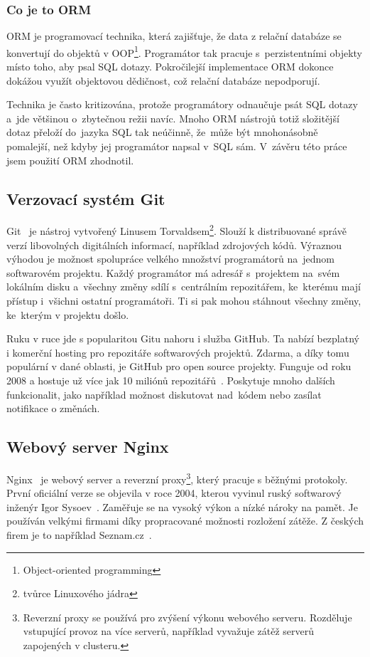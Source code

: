 \subsubsection*{Co je to ORM}

ORM je programovací technika, která zajišťuje, že data z relační databáze
se konvertují do objektů v OOP\footnote{Object-oriented programming}. Programátor tak pracuje s~perzistentními
objekty místo toho, aby psal SQL dotazy. Pokročilejší implementace ORM dokonce dokážou využít objektovou dědičnost, což relační databáze nepodporují.

Technika je často kritizována, protože programátory odnaučuje psát SQL dotazy a~jde většinou o~zbytečnou režii navíc.
Mnoho ORM nástrojů totiž složitější dotaz přeloží do~jazyka SQL tak neúčinně,
že~může být mnohonásobně pomalejší, než kdyby jej programátor napsal v~SQL sám.
V~závěru této práce jsem použití ORM zhodnotil.

\subsection{Verzovací systém Git}



Git~\cite{git} je nástroj vytvořený Linusem Torvaldsem\footnote{tvůrce Linuxového jádra}.
Slouží k distribuované správě verzí libovolných digitálních informací, například zdrojových kódů.
Výraznou výhodou je možnost spolupráce velkého množství programátorů na~jednom softwarovém projektu. 
Každý programátor má adresář s~projektem na~svém lokálním disku a~všechny změny sdílí s~centrálním repozitářem,
ke~kterému mají přístup i~všichni ostatní programátoři. Ti si pak mohou stáhnout všechny změny,
ke~kterým v projektu došlo.

Ruku v ruce jde s popularitou Gitu nahoru i služba GitHub.
Ta nabízí bezplatný i komerční hosting pro repozitáře softwarových projektů.
Zdarma, a díky tomu populární v dané oblasti, je GitHub pro open source projekty.
Funguje od roku 2008 a hostuje už více jak 10 miliónů repozitářů~\cite{git_about}.
Poskytuje mnoho dalších funkcionalit, jako například možnost diskutovat nad~kódem
nebo zasílat notifikace o změnách.

\subsection{Webový server Nginx}

Nginx~\cite{nginx} je webový server a reverzní proxy\footnote{Reverzní proxy se používá pro zvýšení výkonu webového serveru.
Rozděluje vstupující provoz na více serverů, například vyvažuje zátěž serverů zapojených v clusteru.}, který pracuje s běžnými protokoly.
První oficiální verze se objevila v roce 2004, kterou vyvinul ruský softwarový inženýr Igor Sysoev~\cite{nginx_changes}.
Zaměřuje se na vysoký výkon a nízké nároky na pamět. Je používán velkými firmami
díky propracované možnosti rozložení zátěže. Z českých firem je to například Seznam.cz~\cite{nginx_seznam}.

